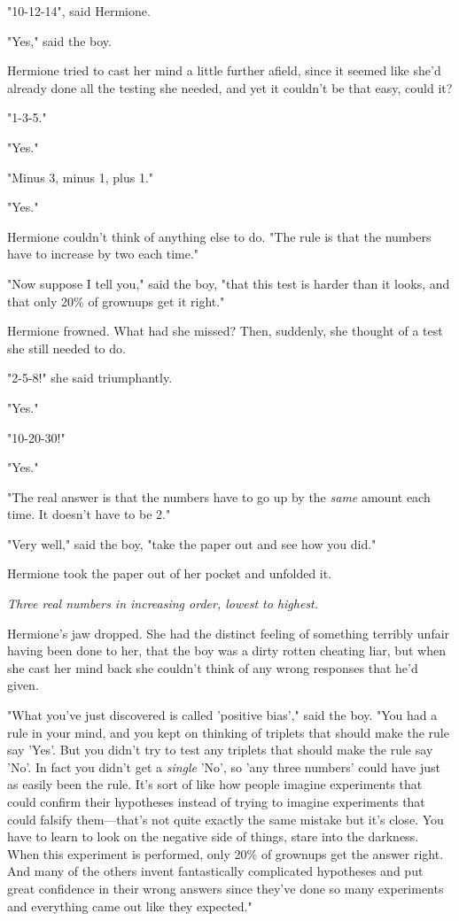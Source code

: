 "10-12-14", said Hermione.

"Yes," said the boy.

Hermione tried to cast her mind a little further afield, since it seemed like 
she'd already done all the testing she needed, and yet it couldn't be that 
easy, could it?

"1-3-5."

"Yes."

"Minus 3, minus 1, plus 1."

"Yes."

Hermione couldn't think of anything else to do. "The rule is that the numbers 
have to increase by two each time."

"Now suppose I tell you," said the boy, "that this test is harder than it 
looks, and that only 20\% of grownups get it right."

Hermione frowned. What had she missed? Then, suddenly, she thought of a test 
she still needed to do.

"2-5-8!" she said triumphantly.

"Yes."

"10-20-30!"

"Yes."

"The real answer is that the numbers have to go up by the \emph{same} amount 
each time. It doesn't have to be 2."

"Very well," said the boy, "take the paper out and see how you did."

Hermione took the paper out of her pocket and unfolded it.

\emph{Three real numbers in increasing order, lowest to highest.}

Hermione's jaw dropped. She had the distinct feeling of something terribly 
unfair having been done to her, that the boy was a dirty rotten cheating liar, 
but when she cast her mind back she couldn't think of any wrong responses that 
he'd given.

"What you've just discovered is called 'positive bias'," said the boy. "You had 
a rule in your mind, and you kept on thinking of triplets that should make the 
rule say 'Yes'. But you didn't try to test any triplets that should make the 
rule say 'No'. In fact you didn't get a \emph{single} 'No', so 'any three 
numbers' could have just as easily been the rule. It's sort of like how people 
imagine experiments that could confirm their hypotheses instead of trying to 
imagine experiments that could falsify them---that's not quite exactly the same 
mistake but it's close. You have to learn to look on the negative side of 
things, stare into the darkness. When this experiment is performed, only 20\% of 
grownups get the answer right. And many of the others invent fantastically 
complicated hypotheses and put great confidence in their wrong answers since 
they've done so many experiments and everything came out like they expected."

